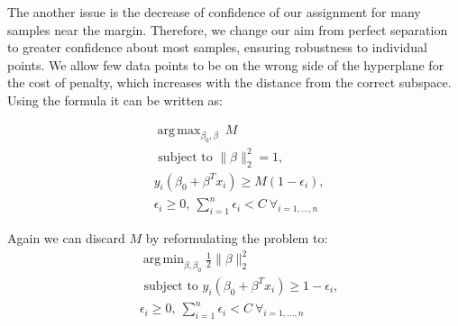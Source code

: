 \documentclass[shortabstract, english, mgr]{iithesis}
\DeclareMathOperator*{\argmax}{arg\,max}
\DeclareMathOperator*{\argmin}{arg\,min}
\begin{document}
The another issue is the decrease of confidence of our assignment for many samples near the margin. Therefore, we change our aim from perfect separation to greater confidence about most samples, ensuring robustness to individual points. We allow few data points to be on the wrong side of the hyperplane for the cost of penalty, which increases with the distance from the correct subspace. Using the formula it can be written as:

\begin{align*}
&{\argmax_{\beta_{0}, \beta} \ M} \\ &{\text { subject to } \|\beta\|_2^2 = 1}, \\ &y_{i}\left(\beta_{0}+\beta^T x_i\right) \geq M(1 - \epsilon_i), \\
& \epsilon_i \geq 0, \ \sum_{i=1}^n \epsilon_i < C \ \forall_{i=1, \ldots, n}
\end{align*}

Again we can discard $M$ by reformulating the problem to:
\begin{align*}
& \argmin_{\beta, \beta_0} \frac{1}{2}\|\beta\|^2_2 \\ &{\text { subject to }} y_{i}\left(\beta_{0}+\beta^T x_i\right) \geq 1 - \epsilon_i, \\ &\epsilon_i \geq 0, \ \sum_{i=1}^n \epsilon_i < C \ \forall_{i=1, \ldots, n}
\end{align*}
\end{document}
